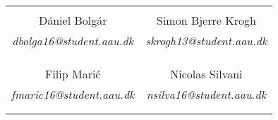 








\begin{table}[H]
	\centering
	\vspace{50em}
		\begin{tabular}{c c }
			\underline{\phantom{mmmmmmmmmmmmmmmmmmm}}       & \underline{\phantom{mmmmmmmmmmmmmmmmmmm}} \\
			Dániel Bolgár			 & Simon Bjerre Krogh  \\
			\textit{dbolga16@student.aau.dk} & \textit{skrogh13@student.aau.dk}\\
			&\\
			&\\
			\underline{\phantom{mmmmmmmmmmmmmmmmmmm}}       & \underline{\phantom{mmmmmmmmmmmmmmmmmmm}} \\
		    Filip Marić			 & Nicolas Silvani\\
			\textit{fmaric16@student.aau.dk} & \textit{nsilva16@student.aau.dk} \\
			&\\
			&\\	
		\end{tabular}
\end{table}